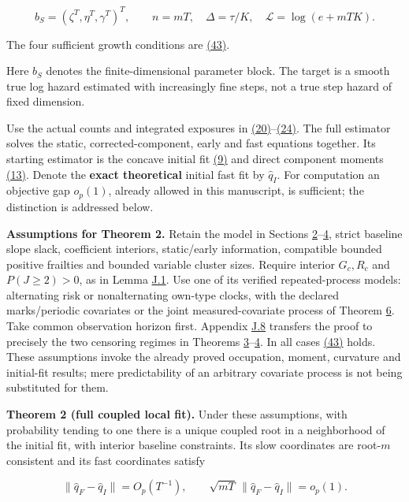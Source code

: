 \documentclass[11pt]{article}
\begin{document}
\begin{equation*}
b_S=(\zeta^T,\eta^T,\gamma^T)^T,\qquad n=mT,\quad\Delta=\tau/K,\quad\mathscr L=\log(e+mTK).
\end{equation*}

The four sufficient growth conditions are \hyperref[eq:43]{(43)}.

Here \(b_S\) denotes the finite-dimensional parameter block. The target is a smooth true log hazard estimated with increasingly fine steps, not a true step hazard of fixed dimension.

Use the actual counts and integrated exposures in \hyperref[eq:20]{(20)}--\hyperref[eq:24]{(24)}. The full estimator solves the static, corrected-component, early and fast equations together. Its starting estimator is the concave initial fit \hyperref[eq:9]{(9)} and direct component moments \hyperref[eq:13]{(13)}. Denote the \textbf{exact theoretical} initial fast fit by \(\widehat q_I\). For computation an objective gap \(o_p(1)\), already allowed in this manuscript, is sufficient; the distinction is addressed below.

\textbf{Assumptions for Theorem 2.} Retain the model in Sections \hyperref[sec:2]{2}--\hyperref[sec:4]{4}, strict baseline slope slack, coefficient interiors, static/early information, compatible bounded positive frailties and bounded variable cluster sizes. Require interior \({G_c},{R_c}\) and \(P(J\geq2)>0\), as in Lemma \hyperref[res:Lemma-J.1]{J.1}. Use one of its verified repeated-process models: alternating risk or nonalternating own-type clocks, with the declared marks/periodic covariates or the joint measured-covariate process of Theorem \hyperref[res:Theorem-6]{6}. Take common observation horizon first. Appendix \hyperref[sec:J.8]{J.8} transfers the proof to precisely the two censoring regimes in Theorems \hyperref[res:Theorem-3]{3}--\hyperref[res:Theorem-4]{4}. In all cases \hyperref[eq:43]{(43)} holds. These assumptions invoke the already proved occupation, moment, curvature and initial-fit results; mere predictability of an arbitrary covariate process is not being substituted for them.

\label{res:Theorem-2}
\textbf{Theorem 2 (full coupled local fit).} Under these assumptions, with probability tending to one there is a unique coupled root in a neighborhood of the initial fit, with interior baseline constraints. Its slow coordinates are root-\(m\) consistent and its fast coordinates satisfy

\begin{equation*}
\|\widehat q_F-\widehat q_I\|=O_p(T^{-1}),\qquad
\sqrt{mT}\,\|\widehat q_F-\widehat q_I\|=o_p(1).
\tag{61}\label{eq:61}
\end{equation*}
\end{document}

